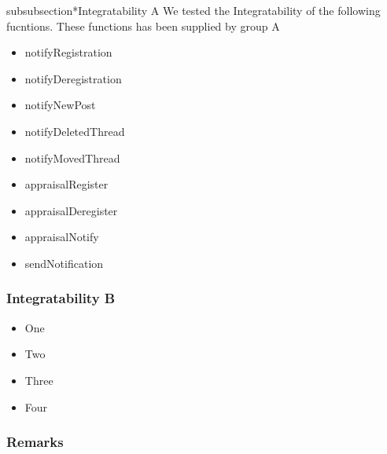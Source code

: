 subsubsection*{Integratability A}
We tested the Integratability of the following fucntions. These functions has been supplied by group A
\begin{itemize}
	\item notifyRegistration
	\item notifyDeregistration
	\item notifyNewPost
	\item notifyDeletedThread 
	\item notifyMovedThread
	\item appraisalRegister
	\item appraisalDeregister
	\item appraisalNotify
	\item sendNotification 
\end{itemize}
\subsubsection*{Integratability B}
\begin{itemize}
	\item One 
	\item Two 
	\item Three 
	\item Four 
\end{itemize}
\subsubsection*{Remarks}
